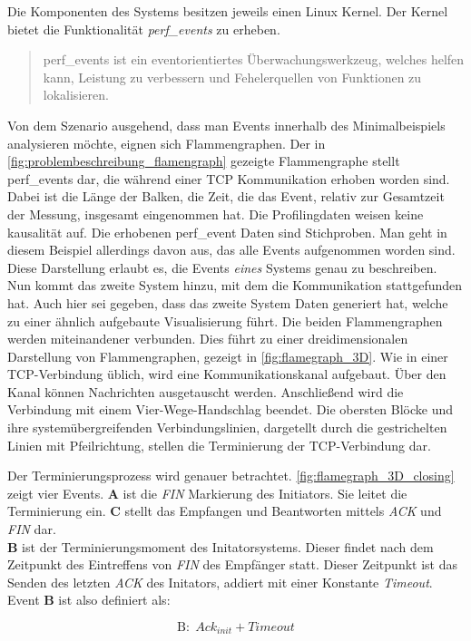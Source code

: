 Die Komponenten des Systems besitzen jeweils einen Linux Kernel. Der Kernel bietet die Funktionalität \emph{perf\_events} zu erheben. 
\begin{quote}
	perf\_events ist ein eventorientiertes Überwachungswerkzeug, welches helfen kann, Leistung zu verbessern und Fehelerquellen von Funktionen zu lokalisieren. 
\end{quote}
Von dem Szenario ausgehend, dass man Events innerhalb des Minimalbeispiels analysieren möchte, eignen sich Flammengraphen.
 Der in \cref{fig:problembeschreibung_flamengraph} gezeigte Flammengraphe stellt perf\_events dar, die während einer TCP Kommunikation erhoben worden sind.  Dabei ist die Länge der Balken, die Zeit, die das Event, relativ zur Gesamtzeit der Messung, insgesamt eingenommen hat. Die Profilingdaten weisen keine kausalität auf. Die erhobenen perf\_event Daten sind Stichproben. Man geht in diesem Beispiel allerdings davon aus, das alle Events aufgenommen worden sind. Diese Darstellung erlaubt es, die Events \emph{eines} Systems genau zu beschreiben. Nun kommt das zweite System hinzu, mit dem die Kommunikation stattgefunden hat. Auch hier sei gegeben, dass das zweite System Daten generiert hat, welche zu einer ähnlich aufgebaute Visualisierung führt. Die beiden Flammengraphen werden miteinandener verbunden. Dies führt zu einer dreidimensionalen Darstellung von Flammengraphen, gezeigt in \cref{fig:flamegraph_3D}. Wie in einer TCP-Verbindung üblich, wird eine Kommunikationskanal aufgebaut. Über den Kanal können Nachrichten ausgetauscht werden. Anschließend wird die Verbindung mit einem Vier-Wege-Handschlag beendet. Die obersten Blöcke und ihre systemübergreifenden Verbindungslinien, dargetellt durch die gestrichelten Linien mit Pfeilrichtung, stellen die Terminierung der TCP-Verbindung dar.
 
 Der Terminierungsprozess wird genauer betrachtet. \cref{fig:flamegraph_3D_closing} zeigt vier Events. \textbf{A} ist die \emph{FIN} Markierung des Initiators. Sie leitet die Terminierung ein. \textbf{C} stellt das Empfangen und Beantworten mittels \emph{ACK} und \emph{FIN} dar. \\
 \textbf{B} ist der Terminierungsmoment des Initatorsystems. Dieser findet nach dem Zeitpunkt des Eintreffens von \emph{FIN} des Empfänger statt. Dieser Zeitpunkt ist das Senden des letzten \emph{ACK} des Initators, addiert mit einer Konstante \emph{Timeout}.  Event \textbf{B} ist also definiert als:
 
\[
	\text{B}: \; Ack_{init} + Timeout  
\]

